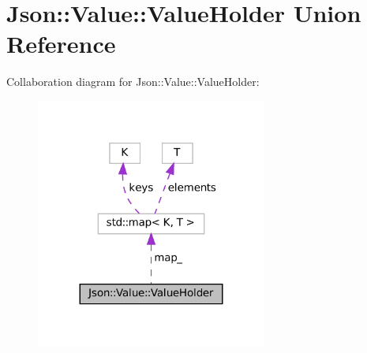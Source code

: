 \hypertarget{unionJson_1_1Value_1_1ValueHolder}{}\section{Json\+:\+:Value\+:\+:Value\+Holder Union Reference}
\label{unionJson_1_1Value_1_1ValueHolder}


Collaboration diagram for Json\+:\+:Value\+:\+:Value\+Holder\+:
\nopagebreak
\begin{figure}[H]
\begin{center}
\leavevmode
\includegraphics[width=215pt]{unionJson_1_1Value_1_1ValueHolder__coll__graph}
\end{center}
\end{figure}

